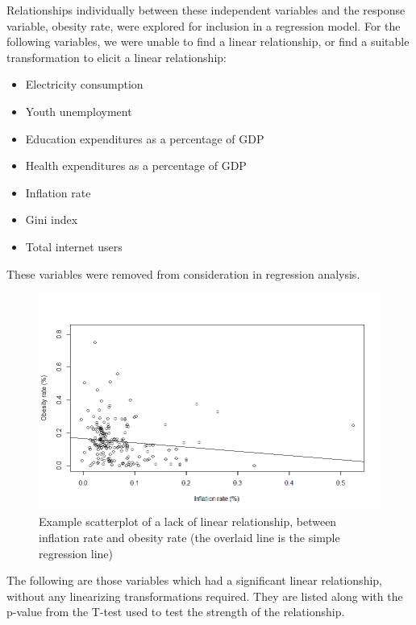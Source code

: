 \documentclass[oneside,12pt]{report}
\begin{document}
Relationships individually between these independent variables and the response variable, obesity rate, were explored for inclusion in a regression model. For the following variables, we were unable to find a linear relationship, or find a suitable transformation to elicit a linear relationship:

\begin{itemize}
\item Electricity consumption
\item Youth unemployment
\item Education expenditures as a percentage of GDP
\item Health expenditures as a percentage of GDP
\item Inflation rate
\item Gini index
\item Total internet users
\end{itemize}

These variables were removed from consideration in regression analysis.

\begin{figure}
\centering
\caption{Example scatterplot of a lack of linear relationship, between inflation rate and obesity rate (the overlaid line is the simple regression line)}
\label{fig:inflation-obesity-scatter}
\includegraphics[width=\textwidth]{inflation-obrate-scatter.png}
\end{figure}

The following are those variables which had a significant linear relationship, without any linearizing transformations required. They are listed along with the p-value from the T-test used to test the strength of the relationship.
\end{document}
